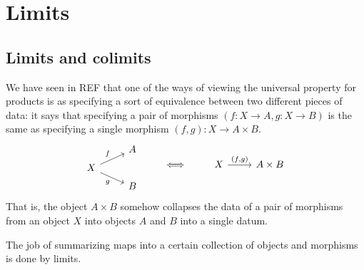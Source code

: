 \documentclass[main.tex]{subfiles}
\begin{document}
\chapter{Limits}\label{ch:limits}

\section{Limits and colimits}

We have seen in REF that one of the ways of viewing the universal property for products is as specifying a sort of equivalence between two different pieces of data: it says that specifying a pair of morphisms $(f\colon X \to A, g\colon X \to B)$ is the same as specifying a single morphism $(f, g)\colon X \to A \times B$.
\begin{equation*}
  \begin{tikzcd}[row sep=tiny]
    & A
    \\
    X
    \arrow[ur, "f"]
    \arrow[dr, swap, "g"]
    \\
    & B
  \end{tikzcd}
  \qquad \iff \qquad
  \begin{tikzcd}
    X
    \arrow[r, "{(f, g)}"]
    & A \times B
  \end{tikzcd}
\end{equation*}
That is, the object $A \times B$ somehow collapses the data of a pair of morphisms from an object $X$ into objects $A$ and $B$ into a single datum.


The job of summarizing maps into a certain collection of objects and morphisms is done by limits.
\end{document}
